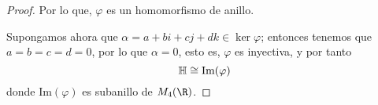 \begin{proof}
    Por lo que, $\varphi$ es un homomorfismo de anillo.

    Supongamos ahora que $\alpha = a + bi +cj +dk \in \ker \varphi$; entonces tenemos que $a = b = c = d = 0$, por lo que $\alpha = 0$, esto es, $\varphi$ es inyectiva, y por tanto
    $$ \mathbb{H} \cong \mbox{Im}(\varphi) $$
    donde $\mbox{Im}(\varphi)$ es subanillo de $M_4(\R)$.

\end{proof}